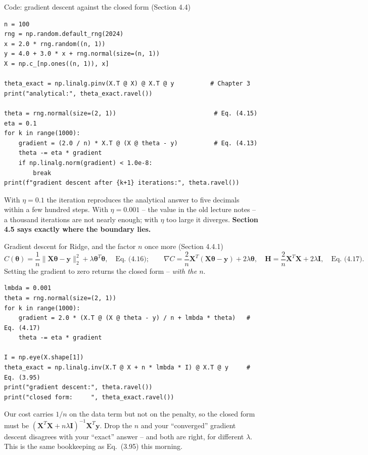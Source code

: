 \documentclass[10pt,aspectratio=169]{beamer}
\begin{document}
\begin{frame}[fragile]{Code: gradient descent against the closed form (Section 4.4)}
\begin{lstlisting}
n = 100
rng = np.random.default_rng(2024)
x = 2.0 * rng.random((n, 1))
y = 4.0 + 3.0 * x + rng.normal(size=(n, 1))
X = np.c_[np.ones((n, 1)), x]

theta_exact = np.linalg.pinv(X.T @ X) @ X.T @ y          # Chapter 3
print("analytical:", theta_exact.ravel())

theta = rng.normal(size=(2, 1))                           # Eq. (4.15)
eta = 0.1
for k in range(1000):
    gradient = (2.0 / n) * X.T @ (X @ theta - y)          # Eq. (4.13)
    theta -= eta * gradient
    if np.linalg.norm(gradient) < 1.0e-8:
        break
print(f"gradient descent after {k+1} iterations:", theta.ravel())
\end{lstlisting}
With $\eta=0.1$ the iteration reproduces the analytical answer to five
decimals within a few hundred steps.  With $\eta=0.001$ -- the value in the
old lecture notes -- a thousand iterations are not nearly enough; with
$\eta$ too large it diverges.  \textbf{Section 4.5 says exactly where the
boundary lies.}
\end{frame}

\begin{frame}[fragile]{Gradient descent for Ridge, and the factor $n$ once more (Section 4.4.1)}
\[
  C(\bm{\theta})=\frac{1}{n}\|\bm{X}\bm{\theta}-\bm{y}\|_2^2+\lambda\bm{\theta}^T\bm{\theta},
  \quad\text{Eq.~(4.16)};\qquad
  \nabla C=\frac{2}{n}\bm{X}^T(\bm{X}\bm{\theta}-\bm{y})+2\lambda\bm{\theta},
  \quad
  \bm{H}=\frac{2}{n}\bm{X}^T\bm{X}+2\lambda\bm{I},\quad\text{Eq.~(4.17)}.
\]
Setting the gradient to zero returns the closed form -- \emph{with the $n$}.
\begin{lstlisting}
lmbda = 0.001
theta = rng.normal(size=(2, 1))
for k in range(1000):
    gradient = 2.0 * (X.T @ (X @ theta - y) / n + lmbda * theta)   # Eq. (4.17)
    theta -= eta * gradient

I = np.eye(X.shape[1])
theta_exact = np.linalg.inv(X.T @ X + n * lmbda * I) @ X.T @ y     # Eq. (3.95)
print("gradient descent:", theta.ravel())
print("closed form:     ", theta_exact.ravel())
\end{lstlisting}
Our cost carries $1/n$ on the data term but not on the penalty, so the
closed form must be $(\bm{X}^T\bm{X}+n\lambda\bm{I})^{-1}\bm{X}^T\bm{y}$.
Drop the $n$ and your ``converged'' gradient descent disagrees with your
``exact'' answer -- and both are right, for different $\lambda$.  This is the
same bookkeeping as Eq.~(3.95) this morning.
\end{frame}
\end{document}
